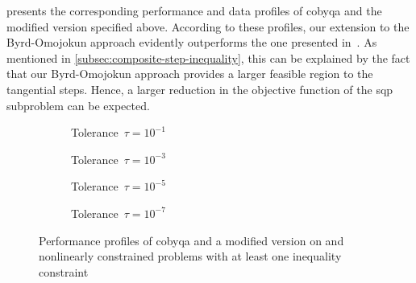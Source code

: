  presents the corresponding performance and data profiles of \gls{cobyqa} and the modified version specified above.
According to these profiles, our extension to the Byrd-Omojokun approach evidently outperforms the one presented in~\cite[\S~15.4.4]{Conn_Gould_Toint_2000}.
As mentioned in \cref{subsec:composite-step-inequality}, this can be explained by the fact that our Byrd-Omojokun approach provides a larger feasible region to the tangential steps.
Hence, a larger reduction in the objective function of the \gls{sqp} subproblem can be expected.

\begin{figure}[ht]
    \centering
    \begin{subfigure}[b]{0.49\textwidth}
        \centering
        \caption{Tolerance~$\tau = 10^{-1}$}
    \end{subfigure}
    \hfill
    \begin{subfigure}[b]{0.49\textwidth}
        \centering
        \caption{Tolerance~$\tau = 10^{-3}$}
    \end{subfigure}
    \begin{subfigure}[b]{0.49\textwidth}
        \centering
        \caption{Tolerance~$\tau = 10^{-5}$}
    \end{subfigure}
    \hfill
    \begin{subfigure}[b]{0.49\textwidth}
        \centering
        \caption{Tolerance~$\tau = 10^{-7}$}
    \end{subfigure}
    \caption[Performance profiles of our new Byrd-Omojokun approach]{Performance profiles of \gls{cobyqa} and a modified version on  and nonlinearly constrained problems with at least one inequality constraint}
    \label{fig:perf-byrd-omojokun}
\end{figure}

